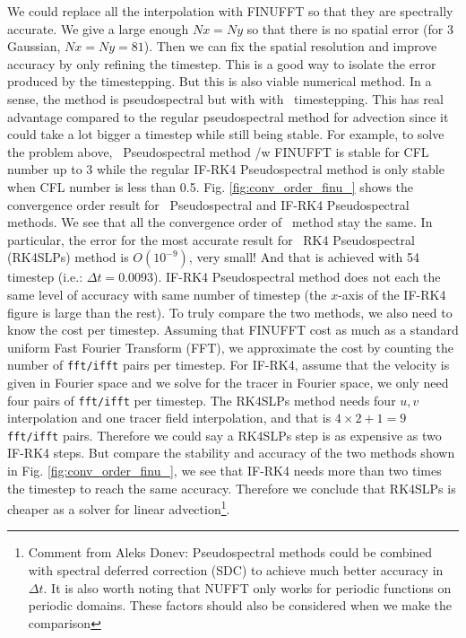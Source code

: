 \documentclass[11pt,letterpaper]{article}
\begin{document}
We could replace all the interpolation with FINUFFT so that they are spectrally accurate. We give a large enough $Nx = Ny$ so that there is no spatial error (for 3 Gaussian, $Nx = Ny = 81$). Then we can fix the spatial resolution and improve accuracy by only refining the timestep. This is a good way to isolate the error produced by the timestepping. But this is also viable numerical method. In a sense, the method is pseudospectral but with with \sml\ timestepping. This has real advantage compared to the regular pseudospectral method for advection since it could take a lot bigger a timestep while still being stable. 
For example, to solve the problem above, \sml\ Pseudospectral method /w FINUFFT is stable for CFL number up to 3 while the regular IF-RK4 Pseudospectral method is only stable when CFL number is less than 0.5. Fig. \ref{fig:conv_order_finu_} shows the convergence order result for \sml\ Pseudospectral and IF-RK4 Pseudospectral methods. We see that all the convergence order of \sml\ method stay the same. In particular, the error for the most accurate result for \sml\ RK4 Pseudospectral (RK4SLPs) method is $O(10^{-9})$, very small! And that is achieved with 54 timestep (i.e.: $\Delta t = 0.0093$). IF-RK4 Pseudospectral method does not each the same level of accuracy with same number of timestep (the $x$-axis of the IF-RK4 figure is large than the rest). To truly compare the two methods, we also need to know the cost per timestep. Assuming that FINUFFT cost as much as a standard uniform Fast Fourier Transform (FFT), we approximate the cost by counting the number of \texttt{fft/ifft} pairs per timestep. For IF-RK4, assume that the velocity is given in Fourier space and we solve for the tracer in Fourier space, we only need four pairs of \texttt{fft/ifft} per timestep. The RK4SLPs method needs four $u,v$ interpolation and one tracer field interpolation, and that is $4\times 2+1 = 9$ \texttt{fft/ifft} pairs. Therefore we could say a RK4SLPs step is as expensive as two IF-RK4 steps. But compare the stability and accuracy of the two methods shown in Fig. \ref{fig:conv_order_finu_}, we see that IF-RK4 needs more than two times the timestep to reach the same accuracy. Therefore we conclude that RK4SLPs is cheaper as a solver for linear advection\footnote{Comment from Aleks Donev: Pseudospectral methods could be combined with spectral deferred correction (SDC) to achieve much better accuracy in $\Delta t$. It is also worth noting that NUFFT only works for periodic functions on periodic domains. These factors should also be considered when we make the comparison}.
\end{document}
